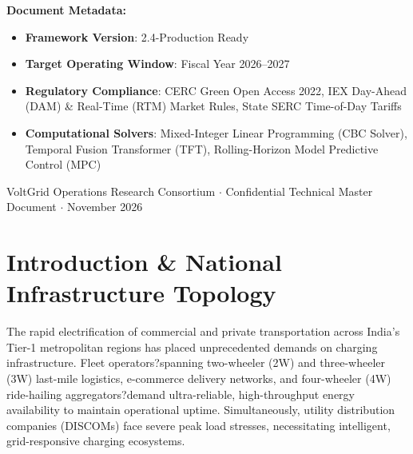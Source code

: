 \documentclass[10.5pt,a4paper]{article}
\begin{document}
\begin{titlepage}
    \vspace{0.8cm}
    \begin{minipage}{0.85\textwidth}
        \small\color{brandslate}
        \textbf{Document Metadata:}
        \begin{itemize}[noitemsep]
            \item \textbf{Framework Version}: 2.4-Production Ready
            \item \textbf{Target Operating Window}: Fiscal Year 2026--2027
            \item \textbf{Regulatory Compliance}: CERC Green Open Access 2022, IEX Day-Ahead (DAM) \& Real-Time (RTM) Market Rules, State SERC Time-of-Day Tariffs
            \item \textbf{Computational Solvers}: Mixed-Integer Linear Programming (CBC Solver), Temporal Fusion Transformer (TFT), Rolling-Horizon Model Predictive Control (MPC)
        \end{itemize}
    \end{minipage}

    \vfill
    {\footnotesize\textsf{\color{brandslate} VoltGrid Operations Research Consortium $\cdot$ Confidential Technical Master Document $\cdot$ November 2026}\par}
\end{titlepage}

\newpage
\tableofcontents
\newpage

\section{Introduction \& National Infrastructure Topology}

The rapid electrification of commercial and private transportation across India's Tier-1 metropolitan regions has placed unprecedented demands on charging infrastructure. Fleet operators?spanning two-wheeler (2W) and three-wheeler (3W) last-mile logistics, e-commerce delivery networks, and four-wheeler (4W) ride-hailing aggregators?demand ultra-reliable, high-throughput energy availability to maintain operational uptime. Simultaneously, utility distribution companies (DISCOMs) face severe peak load stresses, necessitating intelligent, grid-responsive charging ecosystems.
\end{document}
